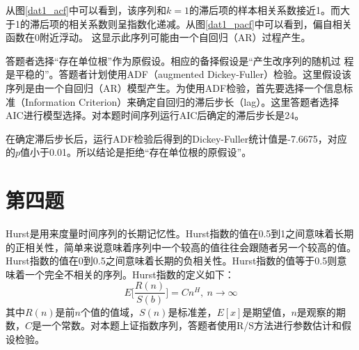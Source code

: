 \documentclass[11pt]{article}
\begin{document}
从图\ref{dat1_acf}中可以看到，该序列和$k=1$的滞后项的样本相关系数接近1。而大于1的滞后项的相关系数则呈指数化递减。从图\ref{dat1_pacf}中可以看到，偏自相关函数在0附近浮动。 这显示此序列可能由一个自回归（AR）过程产生。

答题者选择“存在单位根”作为原假设。相应的备择假设是“产生改序列的随机过 程是平稳的”。答题者计划使用ADF（augmented Dickey-Fuller）检验。这里假设该序列是由一个自回归（AR）模型产生。为使用ADF检验，首先要选择一个信息标准（Information Criterion）来确定自回归的滞后步长（lag）。这里答题者选择AIC进行模型选择。对本题时间序列运行AIC后确定的滞后步长是24。

在确定滞后步长后，运行ADF检验后得到的Dickey-Fuller统计值是-7.6675，对应的$p$值小于0.01。所以结论是拒绝“存在单位根的原假设”。


\section*{第四题}

Hurst是用来度量时间序列的长期记忆性。Hurst指数的值在0.5到1之间意味着长期的正相关性，简单来说意味着序列中一个较高的值往往会跟随者另一个较高的值。Hurst指数的值在0到0.5之间意味着长期的负相关性。Hurst指数的值等于0.5则意味着一个完全不相关的序列。Hurst指数的定义如下：
\begin{equation}
E\bigg[\frac{R(n)}{S(b)}\bigg]=Cn^H,\ n \rightarrow \infty
\end{equation}
其中$R(n)$是前$n$个值的值域，$S(n)$是标准差，$E[x]$是期望值，$n$是观察的期数，$C$是一个常数。对本题上证指数序列，答题者使用R/S方法进行参数估计和假设检验。







\end{document}
